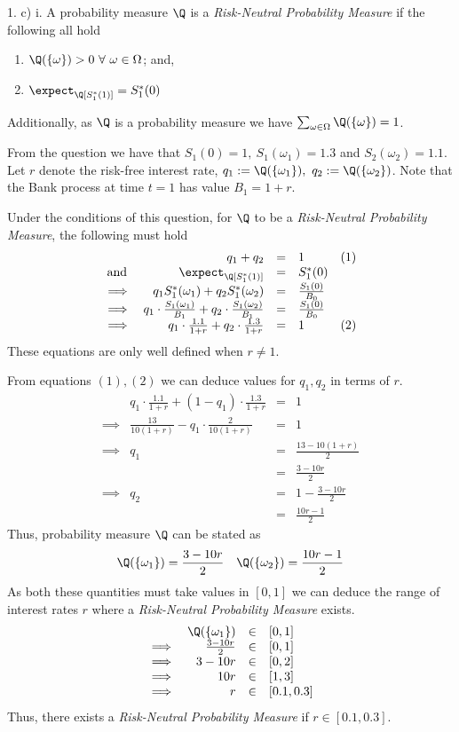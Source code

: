 \documentclass[11pt,a4paper]{article}
\begin{document}
\begin{answer}{1. c) i.}
  A probability measure $\Q$ is a \textit{Risk-Neutral Probability Measure} if the following all hold
  \begin{enumerate}
    \item $\Q(\{\omega\})>0\ \forall\ \omega\in\Omega$; and,
    \item $\expect_\Q[S_1^*(1)]=S_1^*(0)$
  \end{enumerate}
  Additionally, as $\Q$ is a probability measure we have $\sum_{\omega\in\Omega}\Q(\{\omega\})=1$.
  \par From the question we have that $S_1(0)=1,\ S_1(\omega_1)=1.3$ and $S_2(\omega_2)=1.1$. Let $r$ denote the risk-free interest rate, $q_1:=\Q(\{\omega_1\}),\ q_2:=\Q(\{\omega_2\})$. Note that the Bank process at time $t=1$ has value $B_1=1+r$.
  \par Under the conditions of this question, for $\Q$ to be a \textit{Risk-Neutral Probability Measure}, the following must hold
  \[\begin{array}{rrcll}
    &q_1+q_2&=&1&(1)\\
    \text{and }&\expect_\Q[S_1^*(1)]&=&S_1^*(0)\\
    \implies&q_1S_1^*(\omega_1)+q_2S_1^*(\omega_2)&=&\frac{S_1(0)}{B_0}\\
    \implies&q_1\cdot\frac{S_1(\omega_1)}{B_1}+q_2\cdot\frac{S_1(\omega_2)}{B_1}&=&\frac{S_1(0)}{B_0}\\
    \implies&q_1\cdot\frac{1.1}{1+r}+q_2\cdot\frac{1.3}{1+r}&=&1&(2)\\
  \end{array}\]
  These equations are only well defined when $r\neq1$.
  \par From equations $(1),(2)$ we can deduce values for $q_1,q_2$ in terms of $r$.
  \[\begin{array}{rrcl}
    &q_1\cdot\frac{1.1}{1+r}+(1-q_1)\cdot\frac{1.3}{1+r}&=&1\\
    \implies&\frac{13}{10(1+r)}-q_1\cdot\frac2{10(1+r)}&=&1\\
    \implies&q_1&=&\frac{13-10(1+r)}2\\
    &&=&\frac{3-10r}2\\
    \implies&q_2&=&1-\frac{3-10r}2\\
    &&=&\frac{10r-1}{2}
  \end{array}\]
  Thus, probability measure $\Q$ can be stated as
  \[ \Q(\{\omega_1\})=\frac{3-10r}{2}\quad\Q(\{\omega_2\})=\frac{10r-1}2 \]
  As both these quantities must take values in $[0,1]$ we can deduce the range of interest rates $r$ where a \textit{Risk-Neutral Probability Measure} exists.
  \[\begin{array}{rrcl}
    &\Q(\{\omega_1\})&\in&[0,1]\\
    \implies&\frac{3-10r}{2}&\in&[0,1]\\
    \implies&3-10r&\in&[0,2]\\
    \implies&10r&\in&[1,3]\\
    \implies&r&\in&[0.1,0.3]\\
  \end{array}\]
  Thus, there exists a \textit{Risk-Neutral Probability Measure} if $r\in[0.1,0.3]$.
\end{answer}
\end{document}
